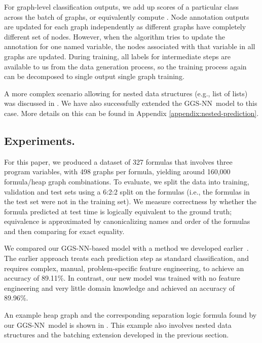 \documentclass{article} \usepackage{iclr2016_conference,times}
\newcommand{\OurMethodShort}{GGS-NN}
\begin{document}
For graph-level classification outputs, we add up scores of a particular class
across the batch of graphs, or equivalently compute .
Node annotation outputs are updated for each graph independently as different
graphs have completely different set of nodes.  However, when the algorithm tries to
update the annotation for one named variable, the nodes
associated with that variable in all graphs are updated.
During training, all labels for intermediate steps are available to us from the data
generation process, so the training process again can be decomposed to single
output single graph training.



A more complex scenario allowing for nested data structures (e.g., list of lists) was discussed in
\cite{brockschmidt2015learning}.
We have also successfully extended the \OurMethodShort~model to this case.
More details on this can be found in Appendix
\ref{appendix:nested-prediction}.


\subsection{Experiments. }
\label{sec:program-verification-results}

For this paper, we produced a dataset of 327 formulas that involves three
program variables, with 498 graphs per formula, yielding around 160,000
formula/heap graph combinations.
To evaluate, we split the data into training, validation and test
sets using a 6:2:2 split on the formulas (i.e., the formulas in the test set
were not in the training set). We measure correctness by
whether the formula predicted at test time is logically equivalent to the
ground truth; equivalence is approximated by canonicalizing names and order
of the formulas and then comparing for exact equality.

We compared our \OurMethodShort-based model with a method we developed
earlier~\citep{brockschmidt2015learning}.
The earlier approach treats each prediction step as standard classification,
and requires complex, manual, problem-specific feature
engineering, to achieve
an accuracy of 89.11\%.
In contrast, our new model was trained with no feature engineering and very
little domain knowledge and achieved an accuracy of 89.96\%.

An example heap graph and the corresponding separation logic formula found by
our \OurMethodShort~model is shown in
. This example also involves nested
data structures and the batching extension developed in the previous section.
\end{document}
